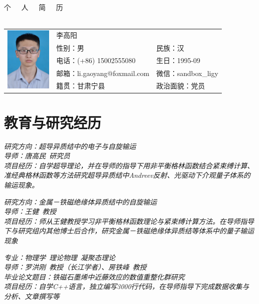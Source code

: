 \documentclass{resume}
\begin{document}

\begin{center}
\Huge{个~~~人~~~简~~~历}
\ \\ \ 
\end{center}
\Large{
  \begin{tabu}{ c l l }
    &
   \scshape{李高阳} &  \\
    & 性别：男 & 民族：汉 \\
    & 电话：(+86) 15002555080 & 生日：1995-09 \\
    & 邮箱：li.gaoyang@foxmail.com & 微信：sandbox\_ligy\\
    & 籍贯：甘肃宁县 & 政治面貌：党员
  \end{tabu}
}

\large
\section{教育与研究经历}
\textit{研究方向：超导异质结中的电子与自旋输运}\\
\textit{导师：唐高民\ 研究员}\\
\textit{项目经历：自学超导理论，并在导师的指导下用非平衡格林函数结合紧束缚计算、准经典格林函数等方法研究超导异质结中Andreev反射、光驱动下介观量子体系的输运现象。}

\textit{研究方向：金属－铁磁绝缘体异质结中的自旋输运}\\
\textit{导师：王健\ 教授}\\
\textit{项目经历：师从王健教授学习非平衡格林函数理论与紧束缚计算方法。在导师指导下与研究组内其他博士后合作，研究金属－铁磁绝缘体异质结等体系中的量子输运现象}

\textit{专业：物理学\ 理论物理\ 凝聚态理论}\\
\textit{导师：罗洪刚\ 教授（长江学者）、房铁峰\ 教授}\\
\textit{毕业论文题目：铁磁石墨烯中近藤效应的数值重整化群研究}\\
\textit{项目经历：自学C++语言，独立编写3000行代码，在导师指导下完成数据收集与分析、文章撰写等}
\end{document}
